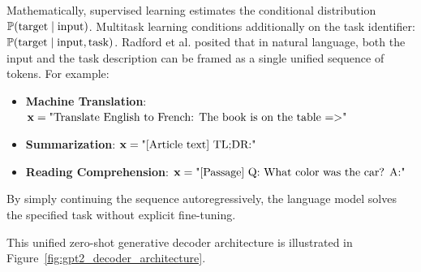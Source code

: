 \documentclass[../../main.tex]{subfiles}
\begin{document}
Mathematically, supervised learning estimates the conditional distribution $\mathbb{P}(\text{target} \mid \text{input})$. Multitask learning conditions additionally on the task identifier: $\mathbb{P}(\text{target} \mid \text{input}, \text{task})$. Radford et al. posited that in natural language, both the input and the task description can be framed as a single unified sequence of tokens. For example:
\begin{itemize}
    \item \textbf{Machine Translation}: $\mathbf{x} = \text{"Translate English to French: The book is on the table =>"}$
    \item \textbf{Summarization}: $\mathbf{x} = \text{"[Article text] TL;DR:"}$
    \item \textbf{Reading Comprehension}: $\mathbf{x} = \text{"[Passage] Q: What color was the car? A:"}$
\end{itemize}
By simply continuing the sequence autoregressively, the language model solves the specified task without explicit fine-tuning.

This unified zero-shot generative decoder architecture is illustrated in Figure~\ref{fig:gpt2_decoder_architecture}.
\end{document}
